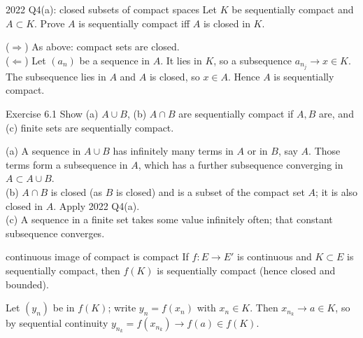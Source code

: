 \begin{exam}{2022 Q4(a): closed subsets of compact spaces}
Let $K$ be sequentially compact and $A\subset K$. Prove $A$ is sequentially compact iff $A$ is
closed in $K$.
\end{exam}
\begin{answer}
($\Rightarrow$) As above: compact sets are closed.\\
($\Leftarrow$) Let $(a_n)$ be a sequence in $A$. It lies in $K$, so a subsequence
$a_{n_j}\to x\in K$. The subsequence lies in $A$ and $A$ is closed, so $x\in A$. Hence $A$ is
sequentially compact.
\end{answer}

\begin{exam}{Exercise 6.1}
Show (a) $A\cup B$, (b) $A\cap B$ are sequentially compact if $A,B$ are, and (c) finite sets are
sequentially compact.
\end{exam}
\begin{answer}
(a) A sequence in $A\cup B$ has infinitely many terms in $A$ or in $B$, say $A$. Those terms form
a subsequence in $A$, which has a further subsequence converging in $A\subset A\cup B$.\\
(b) $A\cap B$ is closed (as $B$ is closed) and is a subset of the compact set $A$; it is also
closed in $A$. Apply 2022 Q4(a).\\
(c) A sequence in a finite set takes some value infinitely often; that constant subsequence
converges.
\end{answer}

\begin{thm}{continuous image of compact is compact}
If $f:E\to E'$ is continuous and $K\subset E$ is sequentially compact, then $f(K)$ is
sequentially compact (hence closed and bounded).
\end{thm}
\begin{answer}
Let $(y_n)$ be in $f(K)$; write $y_n=f(x_n)$ with $x_n\in K$. Then $x_{n_k}\to a\in K$, so by
sequential continuity $y_{n_k}=f(x_{n_k})\to f(a)\in f(K)$.
\end{answer}

